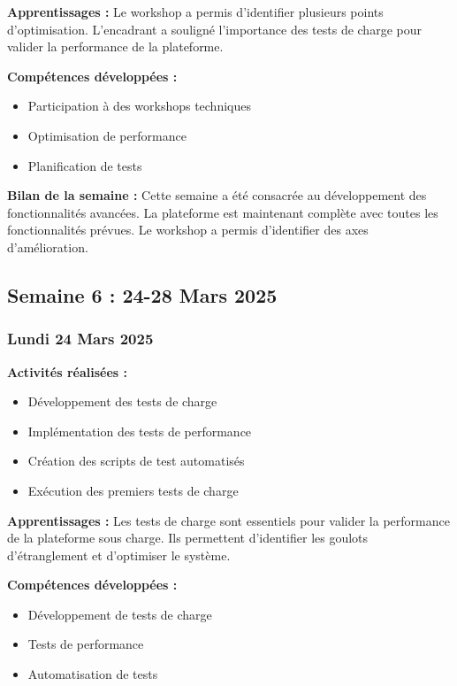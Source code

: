 \documentclass[12pt,a4paper]{article}
\begin{document}
\textbf{Apprentissages :}
Le workshop a permis d'identifier plusieurs points d'optimisation. L'encadrant a souligné l'importance des tests de charge pour valider la performance de la plateforme.

\textbf{Compétences développées :}
\begin{itemize}
    \item Participation à des workshops techniques
    \item Optimisation de performance
    \item Planification de tests
\end{itemize}

\textbf{Bilan de la semaine :}
Cette semaine a été consacrée au développement des fonctionnalités avancées. La plateforme est maintenant complète avec toutes les fonctionnalités prévues. Le workshop a permis d'identifier des axes d'amélioration.

\clearpage
\subsection{Semaine 6 : 24-28 Mars 2025}

\subsubsection{Lundi 24 Mars 2025}
\textbf{Activités réalisées :}
\begin{itemize}
    \item Développement des tests de charge
    \item Implémentation des tests de performance
    \item Création des scripts de test automatisés
    \item Exécution des premiers tests de charge
\end{itemize}

\textbf{Apprentissages :}
Les tests de charge sont essentiels pour valider la performance de la plateforme sous charge. Ils permettent d'identifier les goulots d'étranglement et d'optimiser le système.

\textbf{Compétences développées :}
\begin{itemize}
    \item Développement de tests de charge
    \item Tests de performance
    \item Automatisation de tests
\end{itemize}
\end{document}
